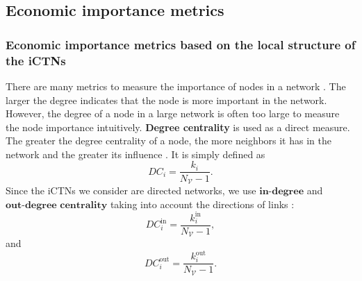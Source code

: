 \documentclass[preprint,3p,times,sort&compress]{elsarticle}
\begin{document}
\subsection{Economic importance metrics}

\subsubsection{Economic importance metrics based on the local structure of the iCTNs}


There are many metrics to measure the importance of nodes in a network \cite{Hao-Manuel-Matus-Zhang-Zhou-2009-PhysRep}. The larger the degree indicates that the node is more important in the network. However, the degree of a node in a large network is often too large to measure the node importance intuitively. \textbf{Degree centrality} is used as a direct measure. The greater the degree centrality of a node, the more neighbors it has in the network and the greater its influence \cite{Garlaschelli-Loffredo-2005-PhysicaA,Ou-Guo-Liu-2022}. It is simply defined as
\begin{equation}
   DC_i=\frac{k_i}{N_\mathscr{V}-1}.
   \label{Eq:centrality:degree}
\end{equation}
Since the iCTNs we consider are directed networks, we use $\textbf{in-degree}$ and $\textbf{out-degree centrality}$ taking into account the directions of links \cite{Du-Tang-Qi-Wang-Han-Yang-2020-PhysicaA}:
\begin{equation}
   DC_i^{\mathrm{in}}=\frac{k_i^{\mathrm{in}}}{N_\mathscr{V}-1},
   \label{Eq:centrality:degree:in}
\end{equation}
and
\begin{equation}
   DC_i^{\mathrm{out}}=\frac{k_i^{\mathrm{out}}}{N_\mathscr{V}-1}.
   \label{Eq:centrality:degree:out}
\end{equation}
\end{document}
